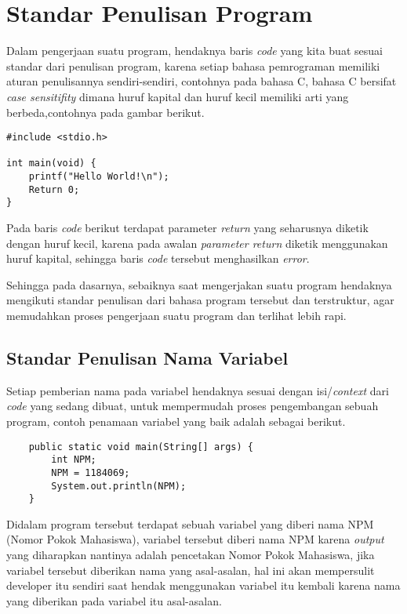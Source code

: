 \chapter{Standar Penulisan Program}

\par 
Dalam pengerjaan suatu program, hendaknya baris \textit{code} yang kita buat sesuai standar dari penulisan program, karena setiap bahasa pemrograman memiliki aturan penulisannya sendiri-sendiri, contohnya pada bahasa C, bahasa C bersifat \textit{case sensitifity} dimana huruf kapital dan huruf kecil memiliki arti yang berbeda,contohnya pada gambar berikut.

\begin{verbatim}
#include <stdio.h>

int main(void) {
    printf("Hello World!\n");
    Return 0;
}
\end{verbatim}

\par 
Pada baris \textit{code} berikut terdapat parameter \textit{return} yang seharusnya diketik dengan huruf kecil, karena pada awalan \textit{parameter return} diketik menggunakan huruf kapital, sehingga baris \textit{code} tersebut menghasilkan \textit{error}.
\par 
Sehingga pada dasarnya, sebaiknya saat mengerjakan suatu program hendaknya mengikuti standar penulisan dari bahasa program tersebut dan terstruktur, agar memudahkan proses pengerjaan suatu program dan terlihat lebih rapi.

\section{Standar Penulisan Nama Variabel}
\par 
Setiap pemberian nama pada variabel hendaknya sesuai dengan isi/\textit{context} dari \textit{code} yang sedang dibuat, untuk mempermudah proses pengembangan sebuah program, contoh penamaan variabel yang baik adalah sebagai berikut.

\begin{verbatim}
	public static void main(String[] args) {	
		int NPM;		
		NPM = 1184069;
		System.out.println(NPM);
	}
\end{verbatim}

\par 
Didalam program tersebut terdapat sebuah variabel yang diberi nama NPM (Nomor Pokok Mahasiswa), variabel tersebut diberi nama NPM karena \textit{output} yang diharapkan nantinya adalah pencetakan Nomor Pokok Mahasiswa, jika variabel tersebut diberikan nama yang asal-asalan, hal ini akan mempersulit developer itu sendiri saat hendak menggunakan variabel itu kembali karena nama yang diberikan pada variabel itu asal-asalan.


